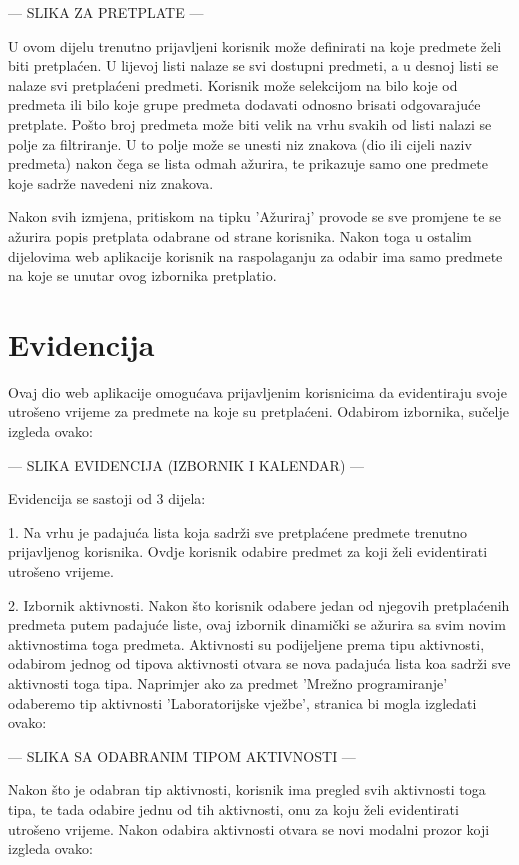 \documentclass[times, utf8, zavrsni]{fer}
\begin{document}
--- SLIKA ZA PRETPLATE ---

U ovom dijelu trenutno prijavljeni korisnik može definirati na koje predmete želi biti pretplaćen. U lijevoj listi nalaze se svi dostupni predmeti, a u desnoj listi se nalaze svi pretplaćeni predmeti. Korisnik može selekcijom na bilo koje od predmeta ili bilo koje grupe predmeta dodavati odnosno brisati odgovarajuće pretplate. Pošto broj predmeta može biti velik na vrhu svakih od listi nalazi se polje za filtriranje. U to polje može se unesti niz znakova (dio ili cijeli naziv predmeta) nakon čega se lista odmah ažurira, te prikazuje samo one predmete koje sadrže navedeni niz znakova.

Nakon svih izmjena, pritiskom na tipku 'Ažuriraj' provode se sve promjene te se ažurira popis pretplata odabrane od strane korisnika. Nakon toga u ostalim dijelovima web aplikacije korisnik na raspolaganju za odabir ima samo predmete na koje se unutar ovog izbornika pretplatio.

\section{Evidencija}
Ovaj dio web aplikacije omogućava prijavljenim korisnicima da evidentiraju svoje utrošeno vrijeme za predmete na koje su pretplaćeni. Odabirom izbornika, sučelje izgleda ovako:

--- SLIKA EVIDENCIJA (IZBORNIK I KALENDAR) ---

Evidencija se sastoji od 3 dijela:

1. Na vrhu je padajuća lista koja sadrži sve pretplaćene predmete trenutno prijavljenog korisnika. Ovdje korisnik odabire predmet za koji želi evidentirati utrošeno vrijeme.

2. Izbornik aktivnosti. Nakon što korisnik odabere jedan od njegovih pretplaćenih predmeta putem padajuće liste, ovaj izbornik dinamički se ažurira sa svim novim aktivnostima toga predmeta. Aktivnosti su podijeljene prema tipu aktivnosti, odabirom jednog od tipova aktivnosti otvara se nova padajuća lista koa sadrži sve aktivnosti toga tipa. Naprimjer ako za predmet 'Mrežno programiranje' odaberemo tip aktivnosti 'Laboratorijske vježbe', stranica bi mogla izgledati ovako:

--- SLIKA SA ODABRANIM TIPOM AKTIVNOSTI ---

Nakon što je odabran tip aktivnosti, korisnik ima pregled svih aktivnosti toga tipa, te tada odabire jednu od tih aktivnosti, onu za koju želi evidentirati utrošeno vrijeme. Nakon odabira aktivnosti otvara se novi modalni prozor koji izgleda ovako:
\end{document}

